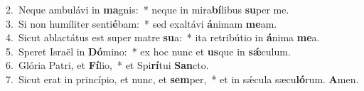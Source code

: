 {2.~}Neque ambulávi in \textbf{ma}gnis:~* neque in mira\textbf{bí}libus \textbf{su}per me.\\
{3.~}Si non humíliter senti\textbf{é}bam:~* sed exaltávi \textbf{á}nimam \textbf{me}am.\\
{4.~}Sicut ablactátus est super matre \textbf{su}a:~* ita retribútio in \textbf{á}nima \textbf{me}a.\\
{5.~}Speret Israël in \textbf{Dó}mino:~* ex hoc nunc et \textbf{us}que in \textbf{sǽ}culum.\\
{6.~}Glória Patri, et \textbf{Fí}lio,~* et Spi\textbf{rí}tui \textbf{San}cto.\\
{7.~}Sicut erat in princípio, et nunc, et \textbf{sem}per,~* et in sǽcula sæcu\textbf{ló}rum. \textbf{A}men.\\
